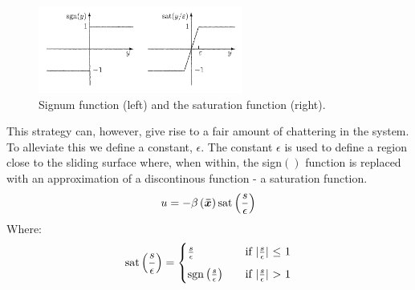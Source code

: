 \begin{figure}[H]
  \centering
  \includegraphics[width=0.6\textwidth]{saturation}
  \caption{Signum function (left) and the saturation function (right).}
  \label{fig:sign_sat}
\end{figure}
This strategy can, however, give rise to a fair amount of chattering in the system. To alleviate this we define a
constant, $\epsilon$. The constant $\epsilon$ is used to define a region close to the sliding surface where, when
within, the sign$()$ function is replaced with an approximation of a discontinous function - a saturation function.
\begin{equation}
  u = -\beta\left( \bm{\bar{x}} \right) \mathrm{sat}\left( \frac{s}{\epsilon} \right)
\end{equation}
Where:
\begin{equation}
  \mathrm{sat}\left( \frac{s}{\epsilon} \right) =
  \begin{cases}
    \frac{s}{\epsilon} &\quad \text{if $\vert\frac{s}{\epsilon}\vert$ $\leq$ 1} \\[2mm]
    \mathrm{sgn}\left( \frac{s}{\epsilon} \right) &\quad \text{if $\vert \frac{s}{\epsilon}\vert$ $>$ 1}
  \end{cases}
\end{equation}

